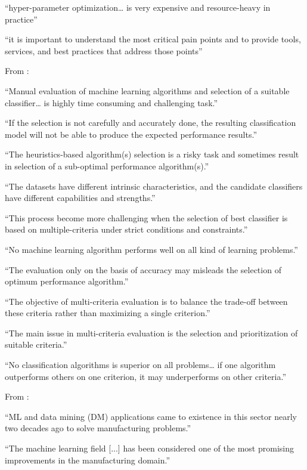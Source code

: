 “hyper-parameter optimization… is very expensive and resource-heavy in practice”

“it is important to understand the most critical pain points and to provide tools, services, and best practices that address those points”

From \parencite{ali2017accurate_multi_criteria_decision_making_methodology_recommending_machine_learning_algorithm} :

“Manual evaluation of machine learning algorithms and selection of a suitable classifier… is highly time consuming and challenging task.”

“If the selection is not carefully and accurately done, the resulting classification model will not be able to produce the expected performance results.”

“The heuristics-based algorithm(s) selection is a risky task and sometimes result in selection of a sub-optimal performance algorithm(s).”

“The datasets have different intrinsic characteristics, and the candidate classifiers have different capabilities and strengths.”

“This process become more challenging when the selection of best classifier is based on multiple-criteria under strict conditions and constraints.”

“No machine learning algorithm performs well on all kind of learning problems.”

“The evaluation only on the basis of accuracy may misleads the selection of optimum performance algorithm.”

“The objective of multi-criteria evaluation is to balance the trade-off between these criteria rather than maximizing a single criterion.”

“The main issue in multi-criteria evaluation is the selection and prioritization of suitable criteria.”

“No classification algorithms is superior on all problems… if one algorithm outperforms others on one criterion, it may underperforms on other criteria.”

From \parencite{dogan2021machine_learning_data_mining_manufacturing} :

“ML and data mining (DM) applications came to existence in this sector nearly two decades ago to solve manufacturing problems.”

“The machine learning field [...] has been considered one of the most promising improvements in the manufacturing domain.”

